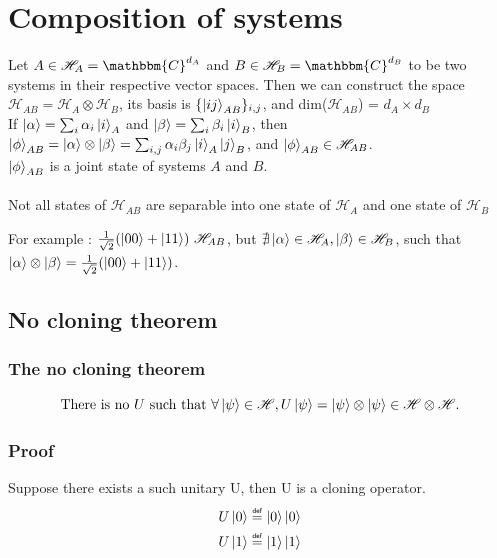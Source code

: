\documentclass{article}
\newcommand\eqdef{\mathrel{\overset{\makebox[0pt]{\mbox{\normalfont\tiny\sffamily def}}}{=}}}
\begin{document}
\section{Composition of systems}
Let $A \in \mathscr{H}_A = \mathbbm{C}^{d_A}$ and $B \in \mathscr{H}_B = \mathbbm{C}^{d_B}$
to be two systems in their respective vector spaces.
Then we can construct the space $\mathscr{H}_{AB} = \mathscr{H}_A \otimes \mathscr{H}_B$, its basis is
$\{\ket{ij}_{AB}\}_{i, j}$, and dim($\mathscr{H}_{AB}$) = $d_A \times d_B$
\\\noindent
If $\ket{\alpha} = \sum_i\alpha_i\ket{i}_A$ and $\ket{\beta} = \sum_i\beta_i\ket{i}_B$,
then $\ket{\phi}_{AB}=\ket{\alpha} \otimes \ket{\beta} = \sum_{i,j}\alpha_i\beta_j\ket{i}_A\ket{j}_B$,
and $\ket{\phi}_{AB} \in \mathscr{H}_{AB}$.
\\\noindent
$\ket{\phi}_{AB}$ is a joint state of systems $A$ and $B$.
\\ \\\noindent
Not all states of $\mathscr{H}_{AB}$ are separable into one state of $\mathscr{H}_{A}$ and one state of $\mathscr{H}_{B}$

For example : $\frac{1}{\sqrt{2}}(\ket{00} + \ket{11}) \ \mathscr{H}_{AB}$, but
$\nexists \ket{\alpha}\in \mathscr{H}_A, \ket{\beta}\in \mathscr{H}_B$, such that \\\noindent
$\ket{\alpha}\otimes\ket{\beta} = \frac{1}{\sqrt{2}}(\ket{00} + \ket{11})$.

\subsection{No cloning theorem}
\subsubsection*{The no cloning theorem}
\begin{equation}
    \text{There is no } U \text{ such that } \forall \ket{\psi} \in \mathscr{H}, U\ket{\psi} = \ket{\psi} \otimes \ket{\psi}
    \in \mathscr{H} \otimes \mathscr{H}.
\end{equation}
\subsubsection*{Proof}
Suppose there exists a such unitary U, then U is a cloning operator.
\begin{equation}
    \begin{aligned}
        U\ket{0} \eqdef \ket{0}\ket{0} \\
        U\ket{1} \eqdef \ket{1}\ket{1}
    \end{aligned}
\end{equation}
\end{document}
